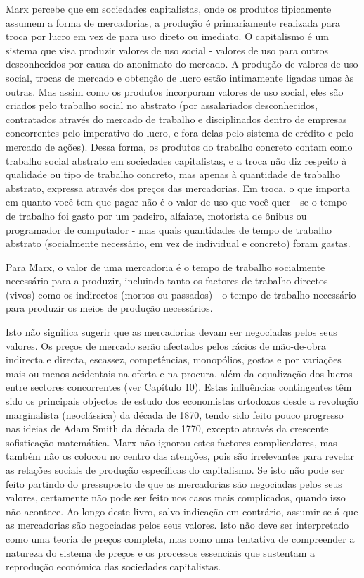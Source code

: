 Marx percebe que em sociedades capitalistas, onde os produtos tipicamente assumem a forma de mercadorias, a produção é primariamente realizada para troca por lucro em vez de para uso direto ou imediato. O capitalismo é um sistema que visa produzir valores de uso social - valores de uso para outros desconhecidos por causa do anonimato do mercado. A produção de valores de uso social, trocas de mercado e obtenção de lucro estão intimamente ligadas umas às outras. Mas assim como os produtos incorporam valores de uso social, eles são criados pelo trabalho social no abstrato (por assalariados desconhecidos, contratados através do mercado de trabalho e disciplinados dentro de empresas concorrentes pelo imperativo do lucro, e fora delas pelo sistema de crédito e pelo mercado de ações). Dessa forma, os produtos do trabalho concreto contam como trabalho social abstrato em sociedades capitalistas, e a troca não diz respeito à qualidade ou tipo de trabalho concreto, mas apenas à quantidade de trabalho abstrato, expressa através dos preços das mercadorias. Em troca, o que importa em quanto você tem que pagar não é o valor de uso que você quer - se o tempo de trabalho foi gasto por um padeiro, alfaiate, motorista de ônibus ou programador de computador - mas quais quantidades de tempo de trabalho abstrato (socialmente necessário, em vez de individual e concreto) foram gastas.
 \par 
Para Marx, o valor de uma mercadoria é o tempo de trabalho socialmente necessário para a produzir, incluindo tanto os factores de trabalho directos (vivos) como os indirectos (mortos ou passados) - o tempo de trabalho necessário para produzir os meios de produção necessários.
 \par 
Isto não significa sugerir que as mercadorias devam ser negociadas pelos seus valores. Os preços de mercado serão afectados pelos rácios de mão-de-obra indirecta e directa, escassez, competências, monopólios, gostos e por variações mais ou menos acidentais na oferta e na procura, além da equalização dos lucros entre sectores concorrentes (ver Capítulo {\color{blue}10}). Estas influências contingentes têm sido os principais objectos de estudo dos economistas ortodoxos desde a revolução marginalista (neoclássica) da década de 1870, tendo sido feito pouco progresso nas ideias de Adam Smith da década de 1770, excepto através da crescente sofisticação matemática. Marx não ignorou estes factores complicadores, mas também não os colocou no centro das atenções, pois são irrelevantes para revelar as relações sociais de produção específicas do capitalismo. Se isto não pode ser feito partindo do pressuposto de que as mercadorias são negociadas pelos seus valores, certamente não pode ser feito nos casos mais complicados, quando isso não acontece. Ao longo deste livro, salvo indicação em contrário, assumir-se-á que as mercadorias são negociadas pelos seus valores. Isto não deve ser interpretado como uma teoria de preços completa, mas como uma tentativa de compreender a natureza do sistema de preços e os processos essenciais que sustentam a reprodução económica das sociedades capitalistas.
